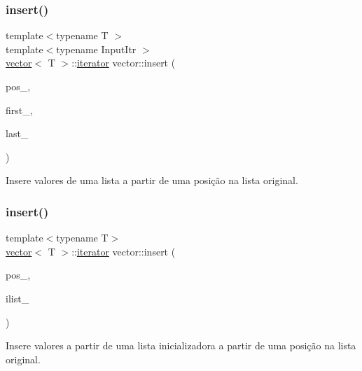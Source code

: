 \subsubsection{\texorpdfstring{insert()}{insert()}\hspace{0.1cm}{\footnotesize\ttfamily [2/3]}}
{\footnotesize\ttfamily template$<$typename T $>$ \\
template$<$typename Input\+Itr $>$ \\
\hyperlink{classsc_1_1vector}{vector}$<$ T $>$\+::\hyperlink{classsc_1_1vector_a9e5d5cc35e379aa27a93989f4a71413c}{iterator} vector\+::insert (\begin{DoxyParamCaption}\item[{\hyperlink{classsc_1_1vector_a9e5d5cc35e379aa27a93989f4a71413c}{iterator}}]{pos\+\_\+,  }\item[{Input\+Itr}]{first\+\_\+,  }\item[{Input\+Itr}]{last\+\_\+ }\end{DoxyParamCaption})}



Insere valores de uma lista a partir de uma posição na lista original. 

\mbox{\label{classsc_1_1vector_a038b7769a69eea810e6913fb910236d6}} 
\subsubsection{\texorpdfstring{insert()}{insert()}\hspace{0.1cm}{\footnotesize\ttfamily [3/3]}}
{\footnotesize\ttfamily template$<$typename T$>$ \\
\hyperlink{classsc_1_1vector}{vector}$<$ T $>$\+::\hyperlink{classsc_1_1vector_a9e5d5cc35e379aa27a93989f4a71413c}{iterator} vector\+::insert (\begin{DoxyParamCaption}\item[{\hyperlink{classsc_1_1vector_a9e5d5cc35e379aa27a93989f4a71413c}{iterator}}]{pos\+\_\+,  }\item[{std\+::initializer\+\_\+list$<$ T $>$}]{ilist\+\_\+ }\end{DoxyParamCaption})}



Insere valores a partir de uma lista inicializadora a partir de uma posição na lista original. 

\mbox{\label{classsc_1_1vector_a9cf88e668b52a2a00961378d60812064}} 
